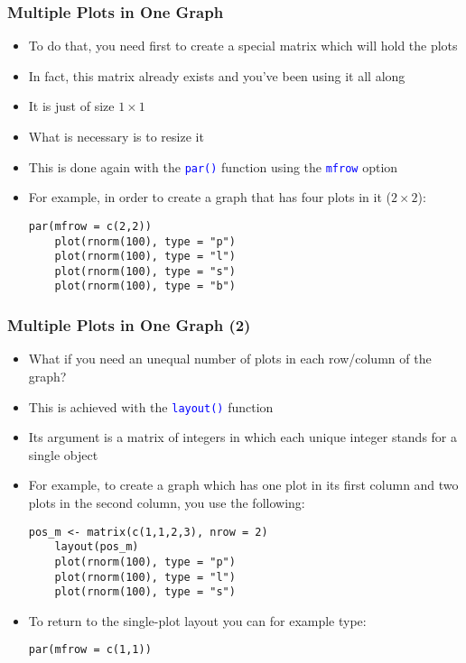 \documentclass[10pt]{beamer}
\newcommand{\cc}[1]{\texttt{\textcolor{blue}{#1}}}
\theoremstyle{definition}
\begin{document}
\begin{frame}[fragile]
\frametitle{Multiple Plots in One Graph}
\begin{itemize}
	\item To do that, you need first to create a special matrix which will hold the plots
	\item In fact, this matrix already exists and you've been using it all along
	\item It is just of size $1 \times 1$
	\item What is necessary is to resize it
	\item This is done again with the \cc{par()} function using the \cc{mfrow} option
	\item For example, in order to create a graph that has four plots in it ($2 \times 2$):
	\begin{lstlisting}[style = rstyle, breaklines]
	par(mfrow = c(2,2))
	plot(rnorm(100), type = "p")
	plot(rnorm(100), type = "l")
	plot(rnorm(100), type = "s")
	plot(rnorm(100), type = "b")
	\end{lstlisting}
\end{itemize}
\end{frame}

\begin{frame}[fragile]
\frametitle{Multiple Plots in One Graph (2)}
\begin{itemize}
	\item What if you need an unequal number of plots in each row/column of the graph?
	\item This is achieved with the \cc{layout()} function
	\item Its argument is a matrix of integers in which each unique integer stands for a single object
	\item For example, to create a graph which has one plot in its first column and two plots in the second column, you use the following:
	\begin{lstlisting}[style = rstyle, breaklines]
	pos_m <- matrix(c(1,1,2,3), nrow = 2)
	layout(pos_m)
	plot(rnorm(100), type = "p")
	plot(rnorm(100), type = "l")
	plot(rnorm(100), type = "s")
	\end{lstlisting}
	\item To return to the single-plot layout you can for example type:
	\begin{lstlisting}[style = rstyle, breaklines]
	par(mfrow = c(1,1))
	\end{lstlisting}
\end{itemize}
\end{frame}
\end{document}

